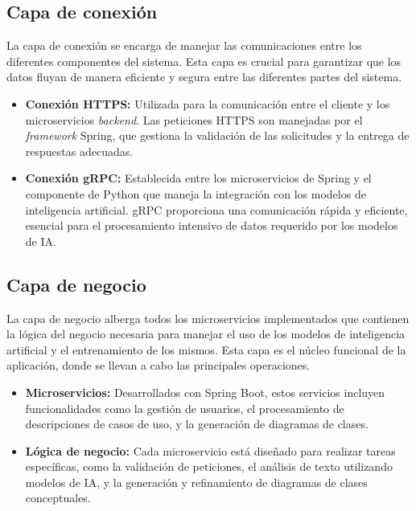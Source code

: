 \subsection{Capa de conexión}

La capa de conexión se encarga de manejar las comunicaciones entre los diferentes componentes del sistema. Esta capa es crucial para garantizar que los datos fluyan de manera eficiente y segura entre las diferentes partes del sistema.

\begin{itemize}
	\item \textbf{Conexión HTTPS:} Utilizada para la comunicación entre el cliente y los microservicios \textit{backend}. Las peticiones HTTPS son manejadas por el \textit{framework} Spring, que gestiona la validación de las solicitudes y la entrega de respuestas adecuadas.
	\item \textbf{Conexión gRPC:} Establecida entre los microservicios de Spring y el componente de Python que maneja la integración con los modelos de inteligencia artificial. gRPC proporciona una comunicación rápida y eficiente, esencial para el procesamiento intensivo de datos requerido por los modelos de IA.
\end{itemize}

\subsection{Capa de negocio}

La capa de negocio alberga todos los microservicios implementados que contienen la lógica del negocio necesaria para manejar el uso de los modelos de inteligencia artificial y el entrenamiento de los mismos. Esta capa es el núcleo funcional de la aplicación, donde se llevan a cabo las principales operaciones.

\begin{itemize}
	\item \textbf{Microservicios:} Desarrollados con Spring Boot, estos servicios incluyen funcionalidades como la gestión de usuarios, el procesamiento de descripciones de casos de uso, y la generación de diagramas de clases.
	\item \textbf{Lógica de negocio:} Cada microservicio está diseñado para realizar tareas específicas, como la validación de peticiones, el análisis de texto utilizando modelos de IA, y la generación y refinamiento de diagramas de clases conceptuales.
\end{itemize}

